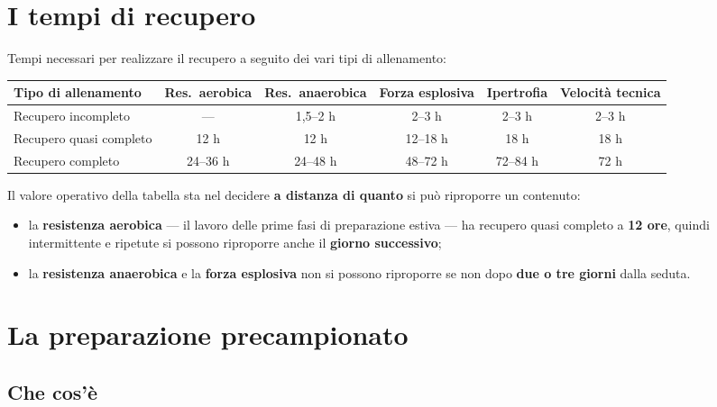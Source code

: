 \section{I tempi di recupero}

Tempi necessari per realizzare il recupero a seguito dei vari tipi di allenamento:

\begin{table}[htbp]
  \centering
  \small
  \renewcommand{\arraystretch}{1.3}
  \begin{tabularx}{\textwidth}{|X|c|c|c|c|c|}
    \hline
    \textbf{Tipo di allenamento} & \textbf{Res.\ aerobica} & \textbf{Res.\ anaerobica} &
      \textbf{Forza esplosiva} & \textbf{Ipertrofia} & \textbf{Velocità tecnica} \\
    \hline
    Recupero incompleto & --- & 1,5--2 h & 2--3 h & 2--3 h & 2--3 h \\
    \hline
    Recupero quasi completo & 12 h & 12 h & 12--18 h & 18 h & 18 h \\
    \hline
    Recupero completo & 24--36 h & 24--48 h & 48--72 h & 72--84 h & 72 h \\
    \hline
  \end{tabularx}
\end{table}

Il valore operativo della tabella sta nel decidere \textbf{a distanza di quanto} si può riproporre un
contenuto:

\begin{itemize}
  \item la \textbf{resistenza aerobica} --- il lavoro delle prime fasi di preparazione estiva --- ha
    recupero quasi completo a \textbf{12 ore}, quindi intermittente e ripetute si possono riproporre
    anche il \textbf{giorno successivo};
  \item la \textbf{resistenza anaerobica} e la \textbf{forza esplosiva} non si possono riproporre se
    non dopo \textbf{due o tre giorni} dalla seduta.
\end{itemize}

\section{La preparazione precampionato}

\subsection{Che cos'è}

